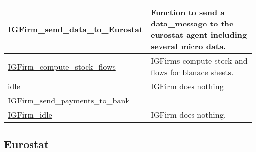 \documentclass[a4paper,11pt]{article}
\begin{document}
\begin{longtable}[H!]{ll}
\midrule
\parbox{5cm}{\url{IGFirm_send_data_to_Eurostat}}  & \parbox{10cm}{Function to send a data\_message to the eurostat agent including several micro data.} \\
\midrule
\parbox{5cm}{\url{IGFirm_compute_stock_flows}}  & \parbox{10cm}{IGFirms compute stock and flows for blanace sheets.} \\
\midrule
\parbox{5cm}{\url{idle}}  & \parbox{10cm}{IGFirm does nothing} \\
\midrule
\parbox{5cm}{\url{IGFirm_send_payments_to_bank}}  & \parbox{10cm}{} \\
\midrule
\parbox{5cm}{\url{IGFirm_idle}}  & \parbox{10cm}{IGFirm does nothing.} \\
\end{longtable}

\subsection{Eurostat}
\end{document}
